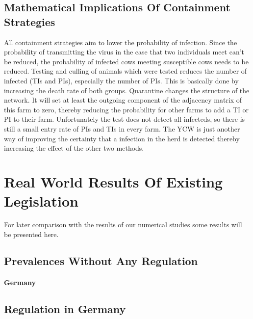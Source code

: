 \subsection{Mathematical Implications Of Containment Strategies}
All containment strategies aim to lower the probability of infection. Since the probability of transmitting the virus in the case that two individuals meet can't be reduced, the probability of infected cows meeting susceptible cows needs to be reduced. 
Testing and culling of animals which were tested reduces the number of infected (TIs and PIs), especially the number of PIs. This is basically done by increasing the death rate of both groups. 
Quarantine changes the structure of the network. It will set at least the outgoing component of the adjacency matrix of this farm to zero, thereby reducing the probability for other farms to add a TI or PI to their farm. Unfortunately the test does not detect all infecteds, so there is still a small entry rate of PIs and TIs in every farm.
The YCW is just another way of improving the certainty that a infection in the herd is detected thereby increasing the effect of the other two methods.

\section{Real World Results Of Existing Legislation}\label{chap:rlData}
For later comparison with the results of our numerical studies some results will be presented here. 

\subsection{Prevalences Without Any Regulation}

\paragraph{Germany}
\subsection{Regulation in Germany}\label{chap:rlDataRegulationGermany}
